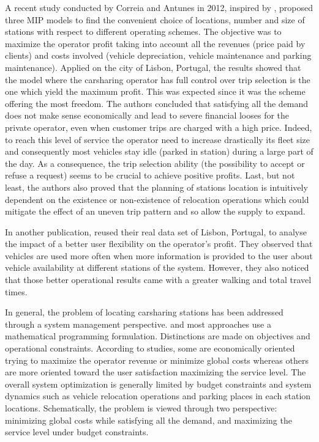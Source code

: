 \begin{bibunit}[ieeetr]
\medskip
A recent study conducted by Correia and Antunes \cite{correia_optimization_2012} in 2012, inspired by \cite{fan_carsharing_2008}, proposed three MIP models to find the convenient choice of locations, number and size of stations with respect to different operating schemes.
The objective was to maximize the operator profit taking into account all the revenues (price paid by clients) and costs involved (vehicle depreciation, vehicle maintenance and parking maintenance).
Applied on the city of Lisbon, Portugal, the results showed that the model where the carsharing operator has full control over trip selection is the one which yield the maximum profit.
This was expected since it was the scheme offering the most freedom.
The authors concluded that satisfying all the demand does not make sense economically and lead to severe financial looses for the private operator, even when customer trips are charged with a high price.
Indeed, to reach this level of service the operator need to increase drastically its fleet size and consequently most vehicles stay idle (parked in station) during a large part of the day.
As a consequence, the trip selection ability (\ie the possibility to accept or refuse a request) seems to be crucial to achieve positive profits.
Last, but not least, the authors also proved that the planning of stations location is intuitively dependent on the existence or non-existence of relocation operations which could mitigate the effect of an uneven trip pattern and so allow the supply to expand.


In another publication, \cite{correia_added_2014} reused their real data set of Lisbon, Portugal, to analyse the impact of a better user flexibility on the operator's profit.
They observed that vehicles are used more often when more information is provided to the user about vehicle availability at different stations of the system.
However, they also noticed that those better operational results came with a greater walking and total travel times.


\medskip
In general, the problem of locating carsharing stations has been addressed through a system management perspective.
and most approaches use a mathematical programming formulation.
Distinctions are made on objectives and operational constraints.
According to studies, some are economically oriented trying to maximize the operator revenue or minimize global costs whereas others are more oriented toward the user satisfaction maximizing the service level.
The overall system optimization is generally limited by budget constraints and system dynamics such as vehicle relocation operations and parking places in each station locations.
Schematically, the problem is viewed through two perspective: minimizing global costs while satisfying all the demand, and maximizing the service level under budget constraints.


\end{bibunit}
